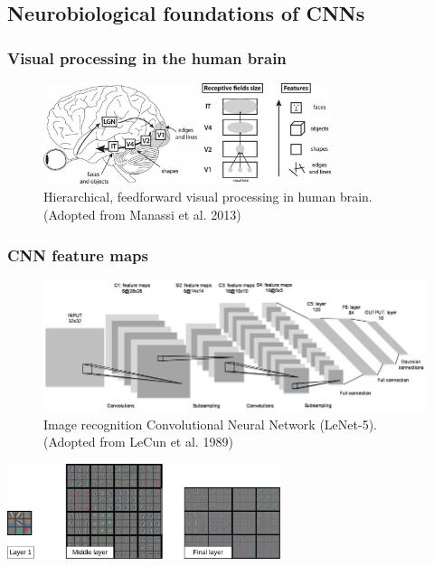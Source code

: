 \documentclass[a4paper,9pt]{beamer}
\theoremstyle{mytheoremstyle}
\begin{document}
\subsection{Neurobiological foundations of CNNs}

\begin{frame}
\frametitle{Visual processing in the human brain}
\begin{figure}
\begin{center}
  \includegraphics[width=0.75\textwidth]{res/human_vision.png}
\end{center}
	\caption{Hierarchical, feedforward visual processing in human brain. (Adopted from Manassi et al. 2013)}
\end{figure}
\end{frame}

\begin{frame}
\frametitle{CNN feature maps}
\begin{figure}
\begin{center}
  \includegraphics[width=\textwidth]{res/lenet.png}
\end{center}
	\caption{Image recognition Convolutional Neural Network (LeNet-5). (Adopted from LeCun et al. 1989)}
\end{figure}
\begin{center}
\includegraphics[width=0.6\textwidth]{res/filter_vis.png}
\end{center}
\end{frame}
\end{document}
